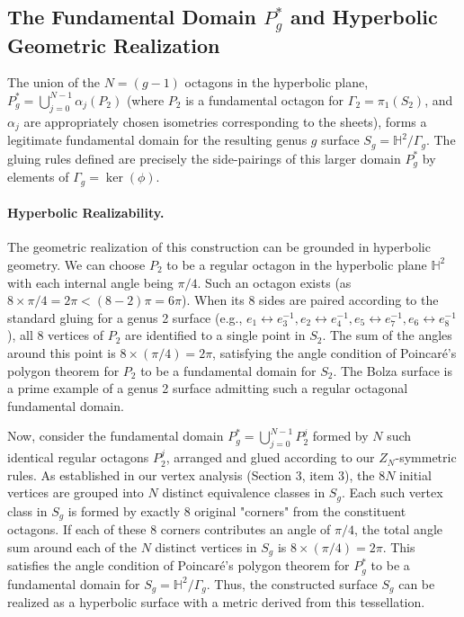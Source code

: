 \documentclass{article}
\theoremstyle{definition}
\theoremstyle{remark}
\begin{document}
\subsection{The Fundamental Domain $P_g^*$ and Hyperbolic Geometric Realization}

The union of the $N=(g-1)$ octagons in the hyperbolic plane, $P_g^* = \bigcup_{j=0}^{N-1} \alpha_j(P_2)$ (where $P_2$ is a fundamental octagon for $\Gamma_2 = \pi_1(S_2)$, and $\alpha_j$ are appropriately chosen isometries corresponding to the sheets), forms a legitimate fundamental domain for the resulting genus $g$ surface $S_g = \mathbb{H}^2/\Gamma_g$. The gluing rules defined are precisely the side-pairings of this larger domain $P_g^*$ by elements of $\Gamma_g = \ker(\phi)$.

\paragraph{Hyperbolic Realizability.}
The geometric realization of this construction can be grounded in hyperbolic geometry.
We can choose $P_2$ to be a regular octagon in the hyperbolic plane $\mathbb{H}^2$ with each internal angle being $\pi/4$. Such an octagon exists (as $8 \times \pi/4 = 2\pi < (8-2)\pi = 6\pi$). When its 8 sides are paired according to the standard gluing for a genus 2 surface (e.g., $e_1 \leftrightarrow e_3^{-1}, e_2 \leftrightarrow e_4^{-1}, e_5 \leftrightarrow e_7^{-1}, e_6 \leftrightarrow e_8^{-1}$), all 8 vertices of $P_2$ are identified to a single point in $S_2$. The sum of the angles around this point is $8 \times (\pi/4) = 2\pi$, satisfying the angle condition of Poincaré's polygon theorem for $P_2$ to be a fundamental domain for $S_2$. The Bolza surface is a prime example of a genus 2 surface admitting such a regular octagonal fundamental domain.

Now, consider the fundamental domain $P_g^* = \bigcup_{j=0}^{N-1} P_2^j$ formed by $N$ such identical regular octagons $P_2^j$, arranged and glued according to our $Z_N$-symmetric rules. As established in our vertex analysis (Section 3, item 3), the $8N$ initial vertices are grouped into $N$ distinct equivalence classes in $S_g$. Each such vertex class in $S_g$ is formed by exactly 8 original "corners" from the constituent octagons. If each of these 8 corners contributes an angle of $\pi/4$, the total angle sum around each of the $N$ distinct vertices in $S_g$ is $8 \times (\pi/4) = 2\pi$. This satisfies the angle condition of Poincaré's polygon theorem for $P_g^*$ to be a fundamental domain for $S_g = \mathbb{H}^2/\Gamma_g$. Thus, the constructed surface $S_g$ can be realized as a hyperbolic surface with a metric derived from this tessellation.
\end{document}
